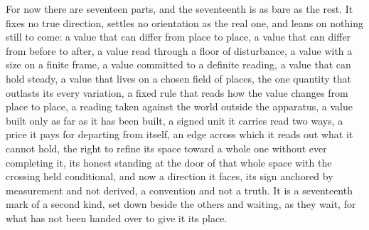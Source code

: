 For now there are seventeen parts, and the seventeenth is as bare as the rest. It fixes no true direction, settles no orientation as the real one, and leans on nothing still to come: a value that can differ from place to place, a value that can differ from before to after, a value read through a floor of disturbance, a value with a size on a finite frame, a value committed to a definite reading, a value that can hold steady, a value that lives on a chosen field of places, the one quantity that outlasts its every variation, a fixed rule that reads how the value changes from place to place, a reading taken against the world outside the apparatus, a value built only as far as it has been built, a signed unit it carries read two ways, a price it pays for departing from itself, an edge across which it reads out what it cannot hold, the right to refine its space toward a whole one without ever completing it, its honest standing at the door of that whole space with the crossing held conditional, and now a direction it faces, its sign anchored by measurement and not derived, a convention and not a truth. It is a seventeenth mark of a second kind, set down beside the others and waiting, as they wait, for what has not been handed over to give it its place.
